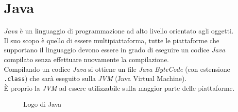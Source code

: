 \section{Java}
\emph{Java} è un linguaggio di programmazione ad alto livello orientato agli oggetti.\\
Il suo scopo è quello di essere multipiattaforma, tutte le piattaforme che supportano il linguaggio devono essere in grado di eseguire un codice \emph{Java} compilato senza effettuare nuovamente la compilazione.\\
Compilando un codice \emph{Java} si ottiene un file \emph{Java ByteCode} (con estensione \texttt{.class}) che sarà eseguito sulla \emph{JVM} (Java Virtual Machine).\\
È proprio la \emph{JVM} ad essere utilizzabile sulla maggior parte delle piattaforme.\\
\begin{figure}[ht]
	\centering
	\caption{Logo di Java}
	\label{fig:one}
\end{figure}

